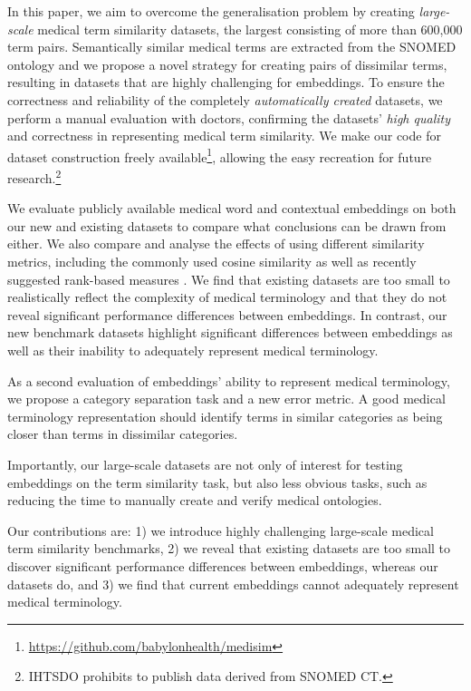 \documentclass[letterpaper]{article} %
\begin{document}
In this paper, we aim to overcome the generalisation problem by creating \emph{large-scale} medical term similarity datasets, the largest consisting of more than 600,000 term pairs.
Semantically similar medical terms are extracted from
 the SNOMED ontology \cite{donnelly2006snomed}
and we propose a novel strategy for creating pairs of dissimilar terms, resulting in datasets that are highly challenging for embeddings.
To ensure the correctness and reliability of the completely \emph{automatically created} datasets, we perform a manual evaluation with doctors, confirming the datasets' \emph{high quality} and correctness in representing medical term similarity.
We make our code for dataset construction freely available\footnote{\label{repo}\url{https://github.com/babylonhealth/medisim}}, allowing the easy recreation for future research.\footnote{IHTSDO prohibits to publish data derived from SNOMED CT.}

We evaluate publicly available medical word and contextual embeddings on both our new
and existing datasets to compare what conclusions can be drawn from either.
We also compare and analyse the effects of using different similarity metrics, including the commonly used cosine similarity as well as recently suggested rank-based measures \cite{ZhelezniakEtAl2019-correlation}.
We find that existing datasets are too small to realistically reflect the complexity of medical terminology and that they do not reveal significant performance differences between embeddings. In contrast, our new benchmark datasets highlight significant differences between embeddings as well as their inability to adequately represent medical terminology.

As a second evaluation of embeddings' ability to represent medical terminology, we propose a category separation task and a new error metric.
A good medical terminology representation should identify terms in similar categories as being closer than terms in dissimilar categories.

Importantly, our large-scale datasets are not only of interest for testing embeddings on the term similarity task, but also less obvious tasks, such as reducing the time to manually create and verify medical ontologies.



Our contributions are:
1) we introduce highly challenging large-scale medical term similarity benchmarks,
2) we reveal that existing datasets are too small to discover significant performance differences between embeddings, whereas our datasets do, and
3) we find that current embeddings cannot adequately represent medical terminology.
\end{document}

